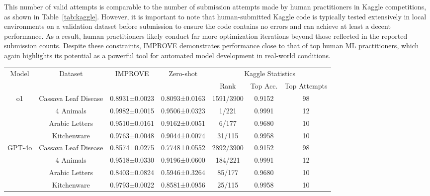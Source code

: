 This number of valid attempts is comparable to the number of submission attempts made by human practitioners in Kaggle competitions, as shown in Table~\ref{tab:kaggle}. However, it is important to note that human-submitted Kaggle code is typically tested extensively in local environments on a validation dataset before submission to ensure the code contains no errors and can achieve at least a decent performance. As a result, human practitioners likely conduct far more optimization iterations beyond those reflected in the reported submission counts. Despite these constraints, IMPROVE demonstrates performance close to that of top human ML practitioners, which again highlights its potential as a powerful tool for automated model development in real-world conditions.

\begin{table*}[ht]
\centering
\caption{Average classification accuracy and leaderboard metrics for IMPROVE-generated models and zeroshot prompting LLMs on four Kaggle Datasets. The table also includes the leaderboard rank of the IMPROVE result, the highest accuracy among all Kaggle submissions, and the average submission attempts for the top 5 leaderboard positions.}
\label{tab:kaggle}
\begin{tabular}{@{}ccccccc@{}}
\toprule
\multirow{2}{*}{Model} & \multirow{2}{*}{Dataset} & \multirow{2}{*}{IMPROVE} & \multirow{2}{*}{Zero-shot} & \multicolumn{3}{c}{Kaggle Statistics} \\
                        &                      &                 &                 & Rank      & Top Acc. & Top Attempts \\ \midrule
\multirow{4}{*}{o1}     & Cassava Leaf Disease & 0.8931±0.0023   & 0.8093±0.0163   & 1591/3900 & 0.9152   & 98           \\
                        & 4 Animals            & 0.9982±0.0015   & 0.9506±0.0323   & 1/221     & 0.9991   & 12           \\
                        & Arabic Letters       & 0.9510±0.0161  & 0.9162±0.0051   & 6/177     & 0.9680   & 10           \\
                        & Kitchenware          & 0.9763±0.0048   & 0.9044±0.0074  & 31/115    & 0.9958   & 10           \\ \midrule
\multirow{4}{*}{GPT-4o} & Cassava Leaf Disease & 0.8574±0.0275   & 0.7748±0.0552   & 2892/3900 & 0.9152   & 98           \\
                        & 4 Animals            & 0.9518±0.0330   & 0.9196±0.0600   & 184/221   & 0.9991   & 12           \\
                        & Arabic Letters       & 0.8403±0.0824   & 0.5946±0.3264   & 85/177    & 0.9680   & 10           \\
                        & Kitchenware          & 0.9793±0.0022   & 0.8581±0.0956   & 25/115    & 0.9958   & 10           \\ \bottomrule
\end{tabular}
\end{table*}

